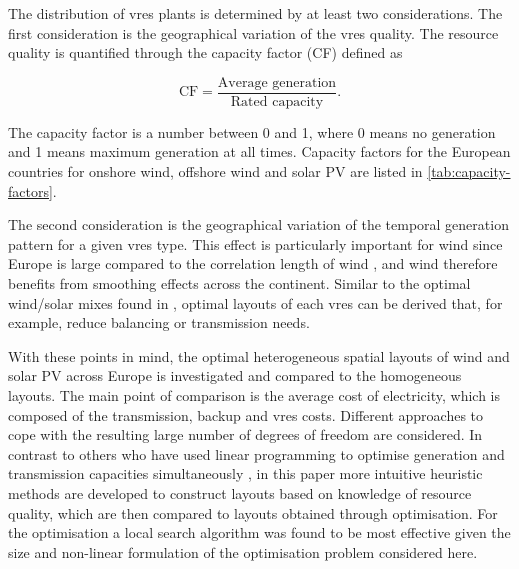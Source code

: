 \documentclass[a4paper, 5p, sort&compress]{elsarticle}%
\begin{document}
The distribution of \gls{vres} plants is determined by at least two considerations.
The first consideration is the geographical
variation of the \gls{vres}
quality. %
The resource quality is quantified through the capacity factor (CF) defined as

\begin{equation}
  \label{eq:1}
  \mbox{CF} = \frac{\mbox{Average generation}}{\mbox{Rated capacity}} .
\end{equation}

The capacity factor is a number between 0 and 1, where 0 means no
generation and 1 means maximum generation at all times. Capacity
factors for the European countries for onshore wind, offshore wind and
solar PV are listed in \cref{tab:capacity-factors}.

The second consideration is the geographical variation of the temporal generation pattern for a
given \gls{vres} type. This effect is particularly important for wind since Europe is large
compared to the correlation length of wind %
\cite{Widen2011}, and wind therefore benefits from smoothing effects across the
continent. Similar to the optimal wind/solar mixes found in \cite{Heide2010,Heide2011}, optimal
layouts of each \gls{vres} can be derived that, for example, reduce balancing or transmission
needs.

With these points in mind, the optimal heterogeneous spatial layouts
of wind and solar PV across Europe is investigated and compared to the
homogeneous layouts. The main point of comparison is the average cost
of electricity, which is composed of the transmission, backup and
\gls{vres} costs.  Different approaches to cope with the resulting
large number of degrees of freedom are considered. In contrast to
others who have used linear programming to
optimise generation and transmission capacities simultaneously
\cite{Czisch,Scholz,Hagspiel}, in this paper more intuitive heuristic
methods are developed to construct layouts based on knowledge of
resource quality, which are then compared to layouts obtained
through optimisation. For the optimisation a
local search algorithm was found to be most effective given the size
and non-linear formulation of the optimisation problem considered here.
\end{document}
